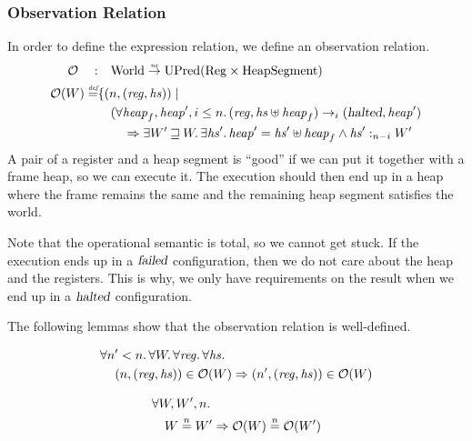 \documentclass{article}
\newcommand{\nefun}{\stackrel{\textit{\tiny{ne}}}{\rightarrow}}
\newcommand{\defeq}{\stackrel{\textit{\tiny{def}}}{=}}
\newcommand{\nequal}[1][n]{\stackrel{\tiny{#1}}{=}}
\newcommand{\var}[1]{\mathit{#1}}
\newcommand{\hs}{\var{hs}}
\newcommand{\reg}{\var{reg}}
\newcommand{\heap}{\var{heap}}
\newcommand{\failed}{\textsl{failed}}
\newcommand{\halted}{\textsl{halted}}
\newcommand{\future}{\mathbin{\sqsupseteq}}
\newcommand{\heapSat}[3][\heap]{#1 :_{#2} #3}
\newcommand{\plaindom}[1]{\mathrm{#1}}
\newcommand{\Regs}{\plaindom{Reg}}
\newcommand{\HeapSegments}{\plaindom{HeapSegment}}
\newcommand{\Worlds}{\plaindom{World}}
\newcommand{\UPred}[1]{\plaindom{UPred}(#1)}
\newcommand{\observations}{\mathcal{O}}
\newcommand{\npair}[2][n]{\left(#1,#2 \right)}
\newcommand{\step}[1][]{\rightarrow_{#1}}
\begin{document}
\subsubsection{Observation Relation}
\label{subsubsec:observation-relation}
In order to define the expression relation, we define an observation relation.
\begin{align*}
  \observations \quad : & \quad  \Worlds \nefun \UPred{\Regs \times \HeapSegments} \\
  \observations (W) \defeq & \{ \npair{(\reg,\hs)} \mid \\
                           & \quad (\forall \heap_f, \heap', i \leq n \ldotp (\reg,\hs \uplus \heap_f) \step[i] (\halted,\heap')  \\
                           & \qquad \Rightarrow \exists W' \future W \ldotp\exists \hs' \ldotp \heap' = \hs' \uplus \heap_f \land \heapSat[\hs']{n-i}{W'}
\end{align*}
A pair of a register and a heap segment is ``good'' if we can put it together with a frame heap, so we can execute it. The execution should then end up in a heap where the frame remains the same and the remaining heap segment satisfies the world.

Note that the operational semantic is total, so we cannot get stuck. If the execution ends up in a $\failed$ configuration, then we do not care about the heap and the registers. This is why, we only have requirements on the result when we end up in a $\halted$ configuration.

The following lemmas show that the observation relation is well-defined.
\begin{lemma}
\label{lem:obs-dc}
  \begin{align*}
    &\forall n' < n \ldotp \forall W \ldotp \forall \reg \ldotp \forall \hs \ldotp\\
    &\quad \npair{(\reg,\hs)} \in \observations(W) \Rightarrow \npair[n']{(\reg,\hs)} \in \observations(W)
  \end{align*}
\end{lemma}

\begin{lemma}
\label{lem:obs-ne-worlds}
\begin{align*}
  &\forall W, W', n \ldotp \\
  &\quad W \nequal W' \Rightarrow \observations(W) \nequal \observations(W')
\end{align*}
\end{lemma}
\end{document}
